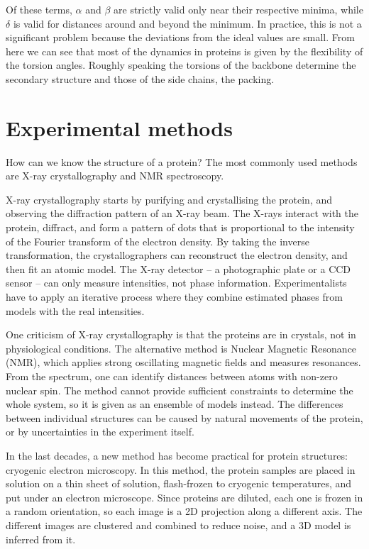 Of these terms, $\alpha$ and $\beta$ are strictly valid only near their respective minima, while $\delta$ is valid for distances around and beyond the minimum.
In practice, this is not a significant problem because the deviations from the ideal values are small. 
From here we can see that most of the dynamics in proteins is given by the flexibility of the torsion angles.
Roughly speaking the torsions of the backbone determine the secondary structure and those of the side chains, the packing.

\section{Experimental methods}
How can we know the structure of a protein?
The most commonly used methods are X-ray crystallography and NMR spectroscopy.

X-ray crystallography starts by
purifying and crystallising the protein, and observing the diffraction pattern of an X-ray beam.
The X-rays interact with the protein, diffract, and form a pattern of dots that is proportional to the intensity of the Fourier transform of the electron density.
By taking the inverse transformation, the crystallographers can reconstruct the electron density, and then fit an atomic model.
The X-ray detector -- a photographic plate or a CCD sensor -- can only measure intensities, not phase information.
Experimentalists have to apply an iterative process where they combine estimated phases from models with the real intensities.

One criticism of X-ray crystallography is that the proteins are in crystals, not in physiological conditions.
The alternative method is Nuclear Magnetic Resonance (NMR),  which applies strong oscillating magnetic fields and measures resonances.
From the spectrum, one can identify distances between atoms with non-zero nuclear spin.
The method cannot provide sufficient constraints to determine the whole system, so it is given as an ensemble of models instead.
The differences between individual structures can be caused by natural movements of the protein, or by uncertainties in the experiment itself.

In the last decades, 
a new method has become practical for protein structures: cryogenic electron microscopy.
In this method, the protein samples are placed in solution on a thin sheet of solution, flash-frozen to cryogenic temperatures, and put under an electron microscope.
Since proteins are diluted, each one is frozen in a random orientation, so each image is a 2D projection along a different axis.
The different images are clustered and combined to reduce noise, and a 3D model is inferred from it.

